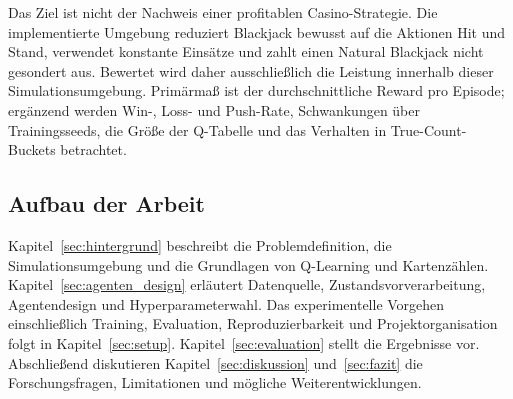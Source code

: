Das Ziel ist nicht der Nachweis einer profitablen Casino-Strategie.
Die implementierte Umgebung reduziert Blackjack bewusst auf die
Aktionen Hit und Stand, verwendet konstante Einsätze und zahlt einen
Natural Blackjack nicht gesondert aus. Bewertet wird daher
ausschließlich die Leistung innerhalb dieser Simulationsumgebung.
Primärmaß ist der durchschnittliche Reward pro Episode; ergänzend
werden Win-, Loss- und Push-Rate, Schwankungen über Trainingsseeds,
die Größe der Q-Tabelle und das Verhalten in True-Count-Buckets betrachtet.

\subsection{Aufbau der Arbeit}

Kapitel~\ref{sec:hintergrund} beschreibt die Problemdefinition, die
Simulationsumgebung und die Grundlagen von Q-Learning und
Kartenzählen. Kapitel~\ref{sec:agenten_design} erläutert Datenquelle,
Zustandsvorverarbeitung, Agentendesign und Hyperparameterwahl. Das
experimentelle Vorgehen einschließlich Training, Evaluation,
Reproduzierbarkeit und Projektorganisation folgt in
Kapitel~\ref{sec:setup}. Kapitel~\ref{sec:evaluation} stellt die
Ergebnisse vor. Abschließend diskutieren Kapitel~\ref{sec:diskussion}
und~\ref{sec:fazit} die Forschungsfragen, Limitationen und mögliche
Weiterentwicklungen.
